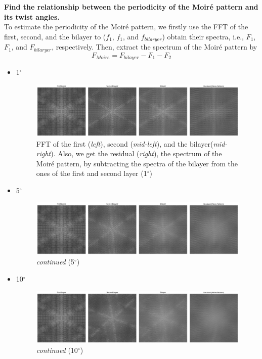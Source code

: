 \documentclass[12pt,a4paper]{article}
\begin{document}
\begin{CJK}{UTF8}{bkai}
\textbf{Find the relationship between the periodicity of the Moiré pattern and its twist angles.}\\
    To estimate the periodicity of the Moiré pattern, we firstly use the FFT of the first, second, and the bilayer to ($f_{1}$, $f_{1}$, and $f_{bilaryer}$) obtain their spectra, i.e., $F_{1}$, $F_{1}$, and $F_{bilaryer}$, respectively. Then, extract the spectrum of the Moiré pattern by
    \begin{equation}
        F_{Moire} = F_{bilayer} - F_{1} - F_{2}
    \end{equation}
\begin{itemize}
    \item 1$^\circ$
    \begin{figure}[h]
        \centering
        \includegraphics[width=0.95\linewidth]{figures/1degree_fft.png}
        \caption{FFT of the first (\textit{left}), second (\textit{mid-left}), and the bilayer(\textit{mid-right}). Also, we get the residual (\textit{right}), the spectrum of the Moiré pattern,  by subtracting the spectra of the bilayer from the ones of the first and second layer (1$^\circ$)}
        \label{fig:moire_1_fft}
    \end{figure}
    \clearpage
    \item 5$^\circ$
    \begin{figure}[h]
        \centering
        \includegraphics[width=0.95\linewidth]{figures/5degree_fft.png}
        \caption{\textit{continued} (5$^\circ$)}
        \label{fig:moire_5_fft}
    \end{figure}
    \item 10$^\circ$
    \begin{figure}[h]
        \centering
        \includegraphics[width=0.95\linewidth]{figures/10degree_fft.png}
        \caption{\textit{continued} (10$^\circ$)}
        \label{fig:moire_10_fft}
    \end{figure}
    

\end{itemize}
\end{CJK}
\end{document}
